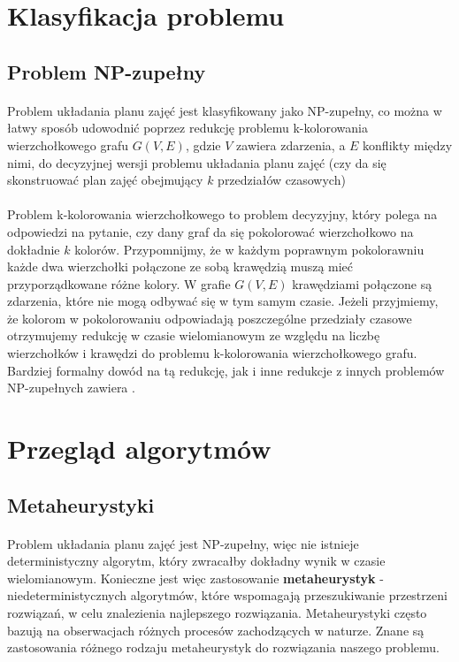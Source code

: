 \section{Klasyfikacja problemu}
\subsection{Problem NP-zupełny}
\paragraph{}Problem układania planu zajęć jest klasyfikowany jako NP-zupełny, co można w łatwy sposób udowodnić poprzez redukcję problemu k-kolorowania wierzchołkowego grafu $G(V, E)$, gdzie $V$ zawiera zdarzenia, a $E$ konflikty między nimi, do decyzyjnej wersji problemu układania planu zajęć (czy da się skonstruować plan zajęć obejmujący $k$ przedziałów czasowych) 
\paragraph{}Problem k-kolorowania wierzchołkowego to problem decyzyjny, który polega na odpowiedzi na pytanie, czy dany graf da się pokolorować wierzchołkowo na dokładnie $k$ kolorów. Przypomnijmy, że w każdym poprawnym pokolorawniu każde dwa wierzchołki połączone ze sobą krawędzią muszą mieć przyporządkowane różne kolory. W grafie $G(V,E)$ krawędziami połączone są zdarzenia, które nie mogą odbywać się w tym samym czasie. Jeżeli przyjmiemy, że kolorom w pokolorowaniu odpowiadają poszczególne przedziały czasowe otrzymujemy redukcję w czasie wielomianowym ze względu na liczbę wierzchołków i krawędzi do problemu k-kolorowania wierzchołkowego grafu. Bardziej formalny dowód na tą redukcję, jak i inne redukcje z innych problemów NP-zupełnych zawiera \cite{npcomplete}.


\section{Przegląd algorytmów}
\subsection{Metaheurystyki}
\paragraph{}Problem układania planu zajęć jest NP-zupełny, więc nie istnieje deterministyczny algorytm, który zwracałby dokładny wynik w czasie wielomianowym. Konieczne jest więc zastosowanie \textbf{metaheurystyk} - niedeterministycznych algorytmów, które wspomagają przeszukiwanie przestrzeni rozwiązań, w celu znalezienia najlepszego rozwiązania. Metaheurystyki często bazują na obserwacjach różnych procesów zachodzących w naturze. Znane są zastosowania różnego rodzaju metaheurystyk do rozwiązania naszego problemu.
